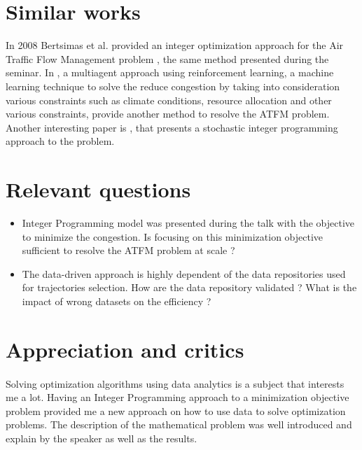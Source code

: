 \documentclass[11pt,a4paper]{article}
\begin{document}
\section{Similar works}

In 2008 Bertsimas et al. provided an integer optimization approach for the Air Traffic Flow Management problem , the same method presented during the seminar. In , a multiagent approach using reinforcement learning, a machine learning technique to solve the reduce congestion by taking into consideration various constraints such as climate conditions, resource allocation and other various constraints, provide another method to resolve the ATFM problem. Another interesting paper is , that presents a stochastic integer programming approach to the problem.

\section{Relevant questions}

\begin{itemize}
  \item Integer Programming model was presented during the talk with the objective to minimize the congestion. Is focusing on this minimization objective sufficient to resolve the ATFM problem at scale ?
  \item The data-driven approach is highly dependent of the data repositories used for trajectories selection. How are the data repository validated ? What is the impact of wrong datasets on the efficiency ?
\end{itemize}

\section{Appreciation and critics}

\paragraph{}


Solving optimization algorithms using data analytics is a subject that interests me a lot. Having an Integer Programming approach to a minimization objective problem provided me a new approach on how to use data to solve optimization problems. The description of the mathematical problem was well introduced and explain by the speaker as well as the results.
\end{document}
